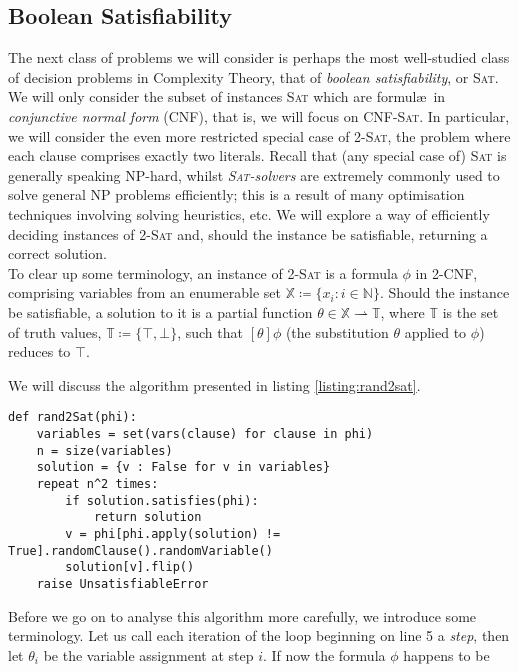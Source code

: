 	\subsection{Boolean Satisfiability}
	The next class of problems we will consider is perhaps the most well-studied class of 
	decision problems in Complexity Theory, that of \emph{boolean satisfiability}, or \textsc{
	Sat}. We will only consider the subset of instances \textsc{Sat} which are formul\ae\ in 
	\emph{conjunctive normal form} (CNF), that is, we will focus on \textsc{CNF-Sat}. In 
	particular, we will consider the even more restricted special case of 2-\textsc{Sat}, the 
	problem where each clause comprises exactly two literals. Recall that (any special case of)
	\textsc{Sat} is generally speaking NP-hard, whilst \emph{\textsc{Sat}-solvers} are 
	extremely commonly used to solve general NP problems efficiently; this is a result of many 
	optimisation techniques involving solving heuristics, etc. We will explore a way of 
	efficiently deciding instances of 2-\textsc{Sat} and, should the instance be satisfiable, 
	returning a correct solution.\\
	To clear up some terminology, an instance of 2-\textsc{Sat} is a formula $\phi$ in 2-CNF, 
	comprising variables from an enumerable set $\mathbb{X} \coloneqq \{x_i : i \in \mathbb{N
	}\}$. Should the instance be satisfiable, a solution to it is a partial function $\theta 
	\in \mathbb{X} \rightharpoonup \mathbb{T}$, where $\mathbb{T}$ is the set of truth values, 
	$\mathbb{T} \coloneqq \{\top,\bot\}$, such that $[\theta]\phi$ (the substitution $\theta$ 
	applied to $\phi$) reduces to $\top$. \par
	We will discuss the algorithm presented in listing \ref{listing:rand2sat}.
	\begin{lstlisting}[label=listing:rand2sat, caption={A randomised algorithm for 
	2-\textsc{Sat}}, style=mystyle]
def rand2Sat(phi):
    variables = set(vars(clause) for clause in phi)
    n = size(variables)
    solution = {v : False for v in variables}
    repeat n^2 times:
        if solution.satisfies(phi):
            return solution
        v = phi[phi.apply(solution) != True].randomClause().randomVariable()
        solution[v].flip()
    raise UnsatisfiableError
	\end{lstlisting}
	Before we go on to analyse this algorithm more carefully, we introduce some terminology.
	Let us call each iteration of the loop beginning on line 5 a \emph{step}, then let 
	$\theta_i$ be the variable assignment at step $i$. If now the formula $\phi$ happens to be 
